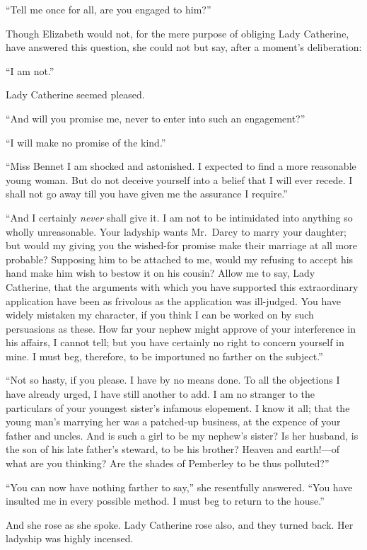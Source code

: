 \documentclass[12pt,english]{book}
\begin{document}
{}``Tell me once for all, are you engaged to him?''\ 

Though Elizabeth would not, for the mere purpose of obliging Lady
Catherine, have answered this question, she could not but say, after
a moment's deliberation:

{}``I am not.''

Lady Catherine seemed pleased.

{}``And will you promise me, never to enter into such an engagement?''\ 

{}``I will make no promise of the kind.''

{}``Miss Bennet I am shocked and astonished. I expected to find a
more reasonable young woman. But do not deceive yourself into a belief
that I will ever recede. I shall not go away till you have given me
the assurance I require.''

{}``And I certainly \textit{never} shall give it. I am not to be
intimidated into anything so wholly unreasonable. Your ladyship wants
Mr.\ Darcy to marry your daughter; but would my giving you the wished-for
promise make their marriage at all more probable? Supposing him to
be attached to me, would my refusing to accept his hand make him wish
to bestow it on his cousin? Allow me to say, Lady Catherine, that
the arguments with which you have supported this extraordinary application
have been as frivolous as the application was ill-judged. You have
widely mistaken my character, if you think I can be worked on by such
persuasions as these. How far your nephew might approve of your interference
in his affairs, I cannot tell; but you have certainly no right to
concern yourself in mine. I must beg, therefore, to be importuned
no farther on the subject.''

{}``Not so hasty, if you please. I have by no means done. To all
the objections I have already urged, I have still another to add.
I am no stranger to the particulars of your youngest sister's infamous
elopement. I know it all; that the young man's marrying her was a
patched-up business, at the expence of your father and uncles. And
is such a girl to be my nephew's sister? Is her husband, is the son
of his late father's steward, to be his brother? Heaven and earth!\mbox{---}of
what are you thinking? Are the shades of Pemberley to be thus polluted?''\ 

{}``You can now have nothing farther to say,'' she resentfully answered.
{}``You have insulted me in every possible method. I must beg to
return to the house.''

And she rose as she spoke. Lady Catherine rose also, and they turned
back. Her ladyship was highly incensed.
\end{document}
